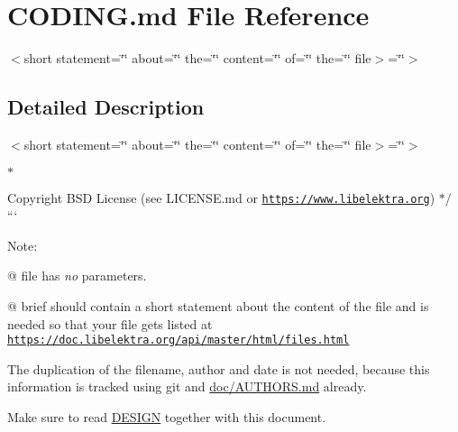 \hypertarget{CODING_8md}{}\section{C\+O\+D\+I\+N\+G.\+md File Reference}
\label{CODING_8md}


$<$short statement=\char`\"{}\char`\"{} about=\char`\"{}\char`\"{} the=\char`\"{}\char`\"{} content=\char`\"{}\char`\"{} of=\char`\"{}\char`\"{} the=\char`\"{}\char`\"{} file$>$=\char`\"{}\char`\"{}$>$
\begin{DoxyItemize}
\item 
\end{DoxyItemize} 




\subsection{Detailed Description}
$<$short statement=\char`\"{}\char`\"{} about=\char`\"{}\char`\"{} the=\char`\"{}\char`\"{} content=\char`\"{}\char`\"{} of=\char`\"{}\char`\"{} the=\char`\"{}\char`\"{} file$>$=\char`\"{}\char`\"{}$>$
\begin{DoxyItemize}
\item 
\end{DoxyItemize}


\begin{DoxyItemize}
\item 
\item $\ast$ \begin{DoxyCopyright}{Copyright}
B\+SD License (see L\+I\+C\+E\+N\+S\+E.\+md or \href{https://www.libelektra.org}{\tt https\+://www.\+libelektra.\+org}) $\ast$/ ```
\end{DoxyCopyright}
Note\+:
\end{DoxyItemize}

{\ttfamily @} {\ttfamily file} has {\itshape no} parameters.
\begin{DoxyItemize}
\item {\ttfamily @} {\ttfamily brief} should contain a short statement about the content of the file and is needed so that your file gets listed at \href{https://doc.libelektra.org/api/master/html/files.html}{\tt https\+://doc.\+libelektra.\+org/api/master/html/files.\+html}
\end{DoxyItemize}

The duplication of the filename, author and date is not needed, because this information is tracked using git and \hyperlink{doc_AUTHORS_md}{doc/\+A\+U\+T\+H\+O\+RS.md} already.


\begin{DoxyItemize}
\item Make sure to read \hyperlink{doc_DESIGN_md}{D\+E\+S\+I\+GN} together with this document. 
\end{DoxyItemize}